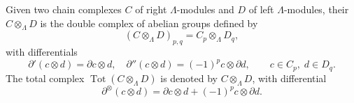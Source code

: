 Given two chain complexes $C$ of right $\Lambda$-modules and $D$ of left $\Lambda$-modules, their  $C \otimes_\Lambda D$ is the double complex of abelian groups defined by
$$(C \otimes_\Lambda D)_{p,q} = C_p \otimes_\Lambda D_q,$$
with differentials
$$\partial'(c \otimes d) = \partial c \otimes d, \quad \partial''(c \otimes d) = (-1)^p c \otimes \partial d, \qquad c \in C_p, \; d \in D_q.$$
The total complex $\operatorname{Tot}(C \otimes_\Lambda D)$ is denoted by $C \otimes_\Lambda D$, with differential
$$\partial^{\otimes}(c \otimes d) = \partial c \otimes d + (-1)^p c \otimes \partial d.$$
